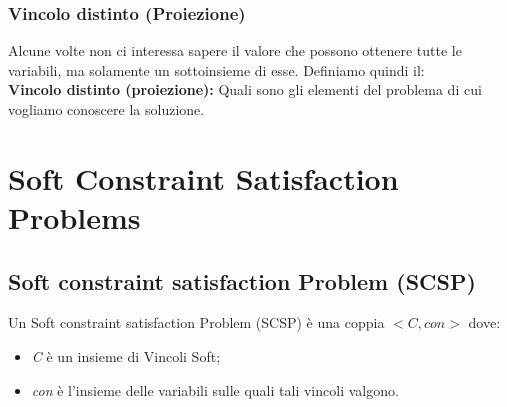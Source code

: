 \subsection{Vincolo distinto (Proiezione)}
Alcune volte non ci interessa sapere il valore che possono ottenere tutte le variabili, ma solamente un sottoinsieme di esse. Definiamo quindi il:
\\
\textbf{Vincolo distinto (proiezione):} Quali sono gli elementi del problema di cui vogliamo conoscere la soluzione.

\chapter{Soft Constraint Satisfaction Problems} \label{ch:Soft Constraint Satisfaction Problems}
\section{Soft constraint satisfaction Problem (SCSP)}
Un Soft constraint satisfaction Problem (SCSP) è una coppia $<C, con>$ dove:
\begin{itemize}
    \item \textit{C} è un insieme di Vincoli Soft;
    \item \textit{con} è l'insieme delle variabili sulle quali tali vincoli valgono.
\end{itemize}

